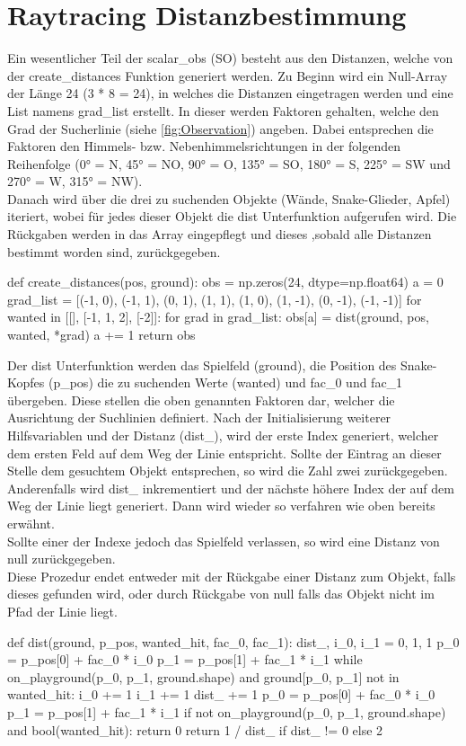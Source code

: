 \section{Raytracing Distanzbestimmung} \label{sec:Anhang-Implementierung-Distanzen}
Ein wesentlicher Teil der scalar\_obs (SO) besteht aus den Distanzen, welche von der create\_distances Funktion generiert werden. Zu Beginn wird ein Null-Array der Länge 24 (3 * 8 = 24), in welches die Distanzen eingetragen werden und eine List namens grad\_list erstellt. In dieser werden Faktoren gehalten, welche den Grad der Sucherlinie (siehe \ref{fig:Observation}) angeben. Dabei entsprechen die Faktoren den Himmels- bzw. Nebenhimmelsrichtungen in der folgenden Reihenfolge (0° = N, 45° = NO, 90° = O, 135° = SO, 180° = S, 225° = SW und 270° = W, 315° = NW).\\
Danach wird über die drei zu suchenden Objekte (Wände, Snake-Glieder, Apfel) iteriert, wobei für jedes dieser Objekt die dist Unterfunktion aufgerufen wird. Die Rückgaben werden in das Array eingepflegt und dieses ,sobald alle Distanzen bestimmt worden sind, zurückgegeben.
\begin{python}
	def create_distances(pos, ground):
		obs = np.zeros(24, dtype=np.float64)
		a = 0
		grad_list = [(-1, 0), (-1, 1), (0, 1), (1, 1), (1, 0), (1, -1), (0, -1), (-1, -1)]
		for wanted in [[], [-1, 1, 2], [-2]]:
			for grad in grad_list:
				obs[a] = dist(ground, pos, wanted, *grad)
				a += 1
		return obs
\end{python}
Der dist Unterfunktion werden das Spielfeld (ground), die Position des Snake-Kopfes (p\_pos) die zu suchenden Werte (wanted) und fac\_0 und fac\_1 übergeben. Diese stellen die oben genannten Faktoren dar, welcher die Ausrichtung der Suchlinien definiert.
Nach der Initialisierung weiterer Hilfsvariablen und der Distanz (dist\_), wird der erste Index generiert, welcher dem ersten Feld auf dem Weg der Linie entspricht. Sollte der Eintrag an dieser Stelle dem gesuchtem Objekt entsprechen, so wird die Zahl zwei zurückgegeben. Anderenfalls wird dist\_ inkrementiert und der nächste höhere Index der auf dem Weg der Linie liegt generiert. Dann wird wieder so verfahren wie oben bereits erwähnt.\\
Sollte einer der Indexe jedoch das Spielfeld verlassen, so wird eine Distanz von null zurückgegeben.\\
Diese Prozedur endet entweder mit der Rückgabe einer Distanz zum Objekt, falls dieses gefunden wird, oder durch Rückgabe von null falls das Objekt nicht im Pfad der Linie liegt. 
\begin{python}
	def dist(ground, p_pos, wanted_hit, fac_0, fac_1):
		dist_, i_0, i_1 = 0, 1, 1
		p_0 = p_pos[0] + fac_0 * i_0
		p_1 = p_pos[1] + fac_1 * i_1
		while on_playground(p_0, p_1, ground.shape) and ground[p_0, p_1] not in wanted_hit:
			i_0 += 1
			i_1 += 1
			dist_ += 1
			p_0 = p_pos[0] + fac_0 * i_0
			p_1 = p_pos[1] + fac_1 * i_1
		if not on_playground(p_0, p_1, ground.shape) and bool(wanted_hit):
			return 0
		return 1 / dist_ if dist_ != 0 else 2
\end{python} 

